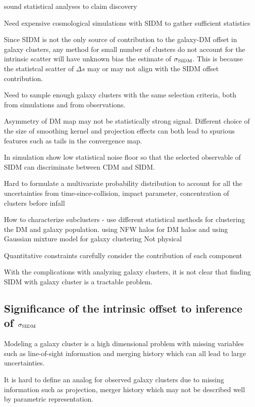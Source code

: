 sound statistical analyses to claim discovery  

Need expensive cosmological simulations with SIDM to gather sufficient statistics 


Since SIDM is not the only source of contribution to the galaxy-DM offset 
in galaxy clusters,
any method for small number of clusters do not account for the intrinsic 
scatter will have unknown bias the estimate of $\sigma_{\rm SIDM}$. 
This is because the statistcal scatter of $\Delta s$ may or may 
not align with the SIDM offset contribution. 

Need to sample enough galaxy clusters with the same selection criteria, 
both from simulations and from observations.

Asymmetry of DM map may not be statistically strong signal.
Different choice of the size of smoothing kernel and projection effects can both 
lead to spurious features such as tails in the convergence map.

In simulation 
show low statistical noise floor so that 
the selected observable of SIDM can discriminate between CDM and SIDM.   

Hard to formulate a multivariate probability distribution to account for all
the uncertainties from 
time-since-collision, impact parameter, concentration of clusters before infall

How to characterize subclusters - 
use different statistical methods for clustering the DM and galaxy 
population. 
using NFW halos for DM halos and using
Gaussian mixture model for galaxy clustering  
Not physical

Quantitative constraints carefully consider the contribution of each component

With the complications with analyzing galaxy clusters, 
it is not clear that finding SIDM with galaxy cluster is a tractable problem. 


\subsection{Significance of the intrinsic offset to inference of $\sigma_{\rm
SIDM}$}
Modeling a galaxy cluster is a high dimensional problem with missing
variables such as line-of-sight information and merging history which can all 
lead to large uncertainties.

It is hard to define an analog for observed galaxy clusters due to missing
information such as projection, merger history which may not be described well
by parametric representation.

